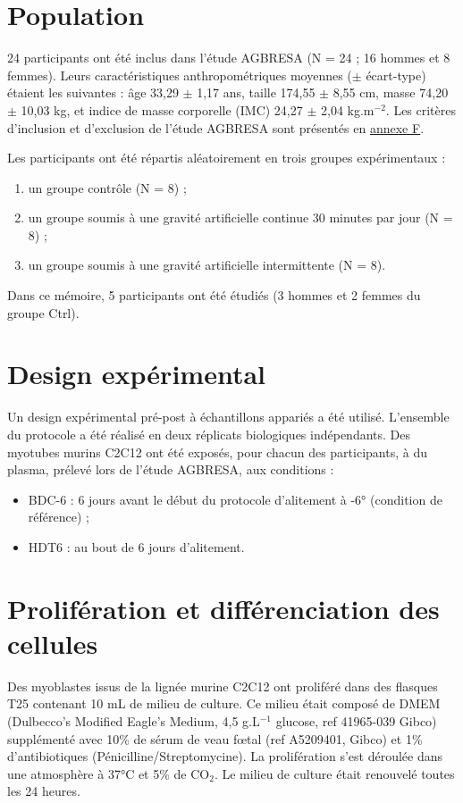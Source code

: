 \documentclass[11pt]{report}
\begin{document}
\section{Population}

24 participants ont été inclus dans l'étude AGBRESA (N = 24 ; 16 hommes et 8 femmes). Leurs caractéristiques anthropométriques moyennes ($\pm$ écart-type) étaient les suivantes : âge 33,29 $\pm$ 1,17 ans, taille 174,55 $\pm$ 8,55 cm, masse 74,20 $\pm$ 10,03 kg, et indice de masse corporelle (IMC) 24,27 $\pm$ 2,04 kg.m$^{-2}$. Les critères d'inclusion et d'exclusion de l'étude AGBRESA sont présentés en \hyperref[annexeF]{annexe F}. 

Les participants ont été répartis aléatoirement en trois groupes expérimentaux : 
\begin{enumerate}
	\item[(Ctrl)] un groupe contrôle (N = 8) ; 
	\item[(cAG)] un groupe soumis à une gravité artificielle continue 30 minutes par jour (N = 8) ;
	\item[(iAG)] un groupe soumis à une gravité artificielle intermittente (N = 8).
\end{enumerate}

Dans ce mémoire, 5 participants ont été étudiés (3 hommes et 2 femmes du groupe Ctrl). 

\section{Design expérimental}

Un design expérimental pré-post à échantillons appariés a été utilisé. L'ensemble du protocole a été réalisé en deux réplicats biologiques indépendants. Des myotubes murins C2C12 ont été exposés, pour chacun des participants, à du plasma, prélevé lors de l'étude AGBRESA, aux conditions :
\begin{itemize}[label*=\textbullet]
	\item BDC-6 : 6 jours avant le début du protocole d'alitement à -6° (condition de référence) ; 
	\item HDT6 : au bout de 6 jours d'alitement.
\end{itemize}

\section{Prolifération et différenciation des cellules}

Des myoblastes issus de la lignée murine C2C12 ont proliféré dans des flasques T25 contenant 10 mL de milieu de culture. Ce milieu était composé de DMEM (Dulbecco's Modified Eagle's Medium, 4,5 g.L$^{-1}$ glucose, ref 41965-039 Gibco) supplémenté avec 10\% de sérum de veau fœtal (ref A5209401, Gibco) et 1\% d'antibiotiques (Pénicilline/Streptomycine). La prolifération s'est déroulée dans une atmosphère à 37°C et 5\% de CO$_2$. Le milieu de culture était renouvelé toutes les 24 heures.
\end{document}
